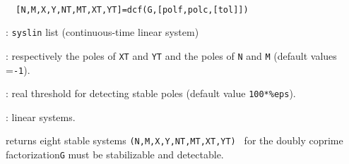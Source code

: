 \begin{mandesc}
   \\ %
\end{mandesc}
\begin{calling_sequence}
\begin{verbatim}
  [N,M,X,Y,NT,MT,XT,YT]=dcf(G,[polf,polc,[tol]])   
\end{verbatim}
\end{calling_sequence}
\begin{parameters}
  \begin{varlist}
    : \verb!syslin! list (continuous-time linear system)
    
    : respectively the poles of \verb!XT! and \verb!YT! and
    the poles of \verb!N!  and \verb!M! (default values =\verb!-1!).
    
    : real threshold for detecting stable poles (default value \verb!100*%eps!).
    
    : linear systems. 
  \end{varlist}
\end{parameters}
\begin{mandescription}
  returns eight stable systems \verb!(N,M,X,Y,NT,MT,XT,YT) !
  for the doubly coprime factorization\verb!G! must be stabilizable and detectable.
\end{mandescription}
\begin{manseealso}
\end{manseealso}
